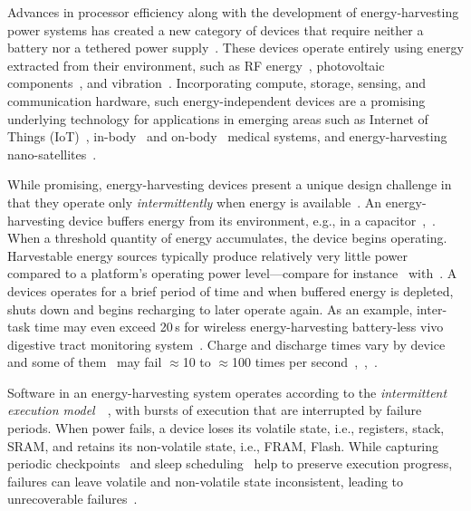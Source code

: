 Advances in processor efficiency along with the development of energy-harvesting power systems has created a new category of devices that require neither a battery nor a tethered power supply~\cite{prasad_comst_2014,lucia_snapl_2017,soyata_csm_2016}. These devices operate entirely using energy extracted from their environment, such as RF energy~\cite{rf_powered_computing_gollakota_2014}, photovoltaic components~\cite{margolies_infocom_2016,margolies_tosn_2016}, and vibration~\cite{gorlatova_sigmetrics_2014}. Incorporating compute, storage, sensing, and communication hardware, such energy-independent devices are a promising underlying technology for applications in emerging areas such as Internet of Things (IoT)~\cite{ku_cst_2016}, in-body~\cite{nadeau_naturebio_2017} and on-body~\cite{bandodkar_electroanalysis_2015} medical systems, and energy-harvesting nano-satellites~\cite{kicksat}.

While promising, energy-harvesting devices present a unique design challenge in
that they operate only {\em intermittently} when energy is available~\cite{hicks_isca_2017,lucia_snapl_2017}. An
energy-harvesting device buffers energy from its environment, e.g., in a
capacitor~\cite[Fig. 3]{gorlatova_tmc_2013},~\cite[Fig. 1]{gunduz_commag_2014}. When a threshold quantity of energy accumulates, the device begins operating. Harvestable energy sources typically produce relatively very little power compared to a platform's operating power level---compare for instance~\cite[Table III and V]{prasad_comst_2014} with~\cite[Table I]{carrano_cst_2014}. A devices operates for a brief period of time and when buffered energy is depleted, shuts down and begins recharging to later operate again. As an example, inter-task time may even exceed 20\,s for wireless energy-harvesting battery-less vivo digestive tract monitoring system~\cite[Fig. 3c]{nadeau_naturebio_2017}. Charge and discharge times vary by device and some of them~\cite{wisp} may fail $\approx$10 to $\approx$100 times per second~\cite[Fig. 1]{tan_infocom_2016},~\cite[Fig. 1]{mementos},~\cite[Fig. 3]{nvp}.


Software in an energy-harvesting system operates according to the {\em
intermittent execution model}~\cite[Sec. 2]{dino}~\cite[Fig. 2]{lucia_snapl_2017}, with bursts of execution that are interrupted by failure periods. When power fails, a device loses its volatile state, i.e., registers, stack, SRAM, and retains its non-volatile state, i.e., FRAM, Flash. While capturing periodic checkpoints~\cite{mementos,quickrecall} and sleep scheduling~\cite{dewdrop,hibernus,hibernusplusplus} help to preserve execution progress, failures can leave volatile and non-volatile state inconsistent, leading to unrecoverable failures~\cite{mspcdino,edb}. 

